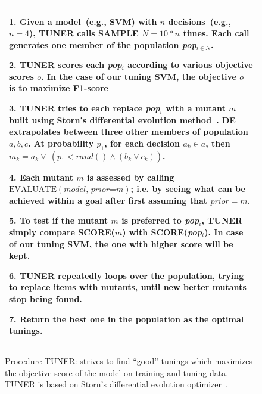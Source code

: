 \documentclass[sigconf]{acmart}
\theoremstyle{break}
\begin{document}
\begin{figure}[!htp]\small
     \begin{tabular}{|p{.95\linewidth}|}\hline
      1. Given a model~(e.g., SVM) with $n$ decisions~(e.g., $n=4$),
      TUNER calls SAMPLE $N=10*n$ times.
      Each call generates one member of the population {\em pop$_{i\in N}$}.

      2. TUNER scores each {\em pop}$_i$ according to various objective
      scores $o$. In the case of our tuning SVM, the objective $o$ is to maximize
     {F1-score}

     3. TUNER tries to each replace {\em pop}$_i$ with a mutant $m$
     built using Storn's differential evolution method~\cite{storn1997differential}.
     DE extrapolates between three other members of population $a,b,c$.
     At probability $p_1$, for each decision $a_k \in a$, then
     $m_k= a_k \vee ~(p_1 < \mathit{rand}() \wedge( b_k \vee c_k))$.

     4. Each mutant $m$ is assessed by calling  $\text{EVALUATE}(\textit{model, prior=m})$;
     i.e. by seeing what can be achieved within a goal after first assuming
     that $\textit{prior}=m$.

     5. To test if the mutant $m$ is preferred to {\em pop}$_i$, TUNER simply
      compare SCORE($m$) with SCORE({\em pop}$_i$). In case of our tuning SVM,
      the one with higher score will be kept.

    6. TUNER repeatedly loops over the population, trying to replace  items with mutants, until new better mutants stop being found.

    7. Return the best one in the population as the optimal tunings.
    \\\hline
    \end{tabular}
    \caption{Procedure TUNER: strives to find ``good'' tunings which maximizes
     the objective score of the model on training and tuning data. TUNER is based on Storn's differential evolution optimizer~\cite{storn1997differential}.}
    \label{fig:optimize}
\end{figure}
\end{document}
